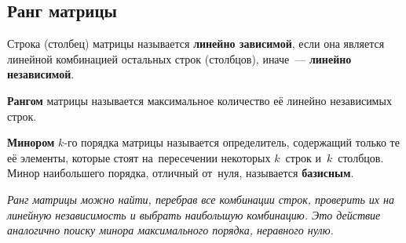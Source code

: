 \subsection{Ранг матрицы}
Строка (столбец) матрицы  называется \textbf{линейно зависимой}, если она является линейной комбинацией остальных строк (столбцов), иначе~--- \textbf{линейно независимой}.

\textbf{Рангом} матрицы называется максимальное количество её линейно независимых строк.

\textbf{Минором} $k$\nobreakdash-го порядка матрицы называется определитель, содержащий только те её элементы, которые стоят на~пересечении некоторых $k$~строк и~$k$~столбцов.
Минор наибольшего порядка, отличный от~нуля, называется \textbf{базисным}.

\textit{Ранг матрицы можно найти, перебрав все комбинации строк, проверить их на линейную независимость и выбрать наибольшую комбинацию. Это действие аналогично поиску минора максимального порядка, неравного нулю.}

